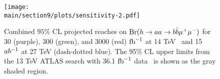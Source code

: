 \begin{figure}[h]
\begin{center}
\texttt{[image: \\main/section9/plots/sensitivity-2.pdf]}
\caption{\small Combined $95\%$ CL projected reaches on ${\mathrm{Br}}(h\to aa \to b\bar{b}\mu^+ \mu^-)$ for 30 (purple), 300 (green), and 3000 (red) ${\rm fb}^{-1}$ at 14 TeV~\cite{Curtin:2014pda} and 15 $ab^{-1}$ at 27 TeV (dash-dotted blue). The 95\% CL upper limits from the 13 TeV ATLAS search with 36.1 ${\rm fb}^{-1}$ data~\cite{Aaboud:2018esj} is shown as the gray shaded region.}
\label{bbmumu}
\end{center}
\end{figure}
